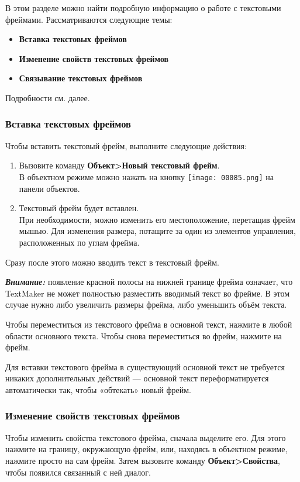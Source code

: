 \documentclass[a4paper,10pt]{article}
\begin{document}
В этом разделе можно найти подробную информацию о работе с текстовыми фреймами. Рассматриваются следующие темы:

\begin{itemize}
 \item \textbf{Вставка текстовых фреймов}
 \item \textbf{Изменение свойств текстовых фреймов}
 \item \textbf{Связывание текстовых фреймов}
\end{itemize}

Подробности см. далее.

\subsubsection{Вставка текстовых фреймов}
Чтобы вставить текстовый фрейм, выполните следующие действия:

\begin{enumerate}
 \item Вызовите команду \textbf{Объект>Новый текстовый фрейм}.\\
 В объектном режиме можно нажать на кнопку \texttt{[image: 00085.png]} на панели объектов.
 \item Текстовый фрейм будет вставлен.\\
 При необходимости, можно изменить его местоположение, перетащив фрейм мышью. Для изменения размера, потащите за один из элементов управления, расположенных по углам фрейма.
\end{enumerate}

Сразу после этого можно вводить текст в текстовый фрейм.

\begin{mdframed}[backgroundcolor=blue!10]
\textbf{\textit{Внимание:}} появление красной полосы на нижней границе фрейма означает, что TextMaker не может полностью разместить вводимый текст во фрейме. В этом случае нужно либо увеличить размеры фрейма, либо уменьшить объём текста.
\end{mdframed}

Чтобы переместиться из текстового фрейма в основной текст, нажмите в любой области основного текста. Чтобы снова переместиться во фрейм, нажмите на фрейм.

Для вставки текстового фрейма в существующий основной текст не требуется никаких дополнительных действий --- основной текст переформатируется автоматически так, чтобы «обтекать» новый фрейм.

\subsubsection{Изменение свойств текстовых фреймов}
Чтобы изменить свойства текстового фрейма, сначала выделите его. Для этого нажмите на границу, окружающую фрейм, или, находясь в объектном режиме, нажмите просто на сам фрейм. Затем вызовите команду \textbf{Объект>Свойства}, чтобы появился связанный с ней диалог.
\end{document}
